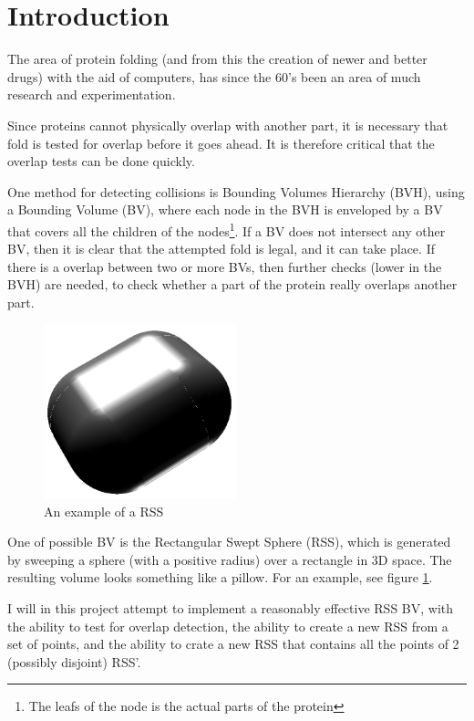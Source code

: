 
\section{Introduction}
\label{introduction}

The area of protein folding (and from this the creation of newer and better drugs) with the aid of computers, has since the 60's been an area of much research and experimentation. 

Since proteins cannot physically overlap with another part, it is necessary that fold is tested for overlap before it goes ahead. It is therefore critical that the overlap tests can be done quickly.

One method for detecting collisions is Bounding Volumes Hierarchy (BVH), using a Bounding Volume (BV), where each node in the BVH is enveloped by a BV that covers all the children of the nodes\footnote{The leafs of the node is the actual parts of the protein}. If a BV does not intersect any other BV, then it is clear that the attempted fold is legal, and it can take place. If there is a overlap between two or more BVs, then further checks (lower in the BVH) are needed, to check whether a part of the protein really overlaps another part.

\begin{figure}
\centering
\includegraphics[width=0.5\textwidth]{figures/rss}
\caption{\label{rss-example-figure}An example of a RSS}
\end{figure}

One of possible BV is the Rectangular Swept Sphere (RSS), which is generated by sweeping a sphere (with a positive radius) over a rectangle in 3D space. The resulting volume looks something like a pillow. For an example, see figure \ref{rss-example-figure}. 

I will in this project attempt to implement a reasonably effective RSS BV, with the ability to test for overlap detection, the ability to create a new RSS from a set of points, and the ability to crate a new RSS that contains all the points of 2 (possibly disjoint) RSS'.


